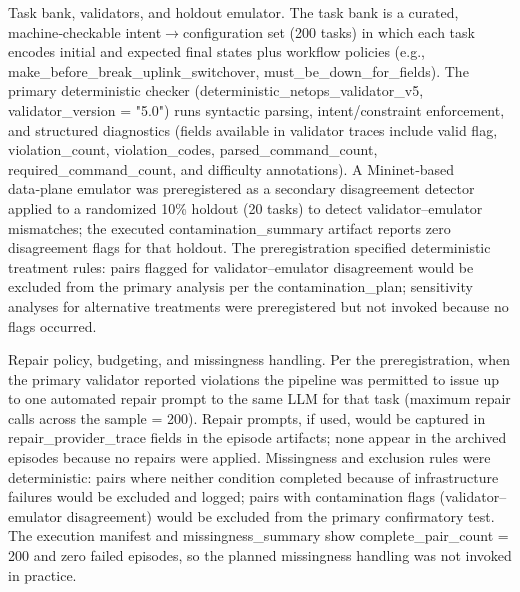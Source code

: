 \documentclass[conference]{IEEEtran}
\begin{document}
Task bank, validators, and holdout emulator. The task bank is a curated, machine‑checkable intent\ensuremath{\rightarrow}configuration set (200 tasks) in which each task encodes initial and expected final states plus workflow policies (e.g., make\_before\_break\_uplink\_switchover, must\_be\_down\_for\_fields). The primary deterministic checker (deterministic\_netops\_validator\_v5, validator\_version = "5.0") runs syntactic parsing, intent/constraint enforcement, and structured diagnostics (fields available in validator traces include valid flag, violation\_count, violation\_codes, parsed\_command\_count, required\_command\_count, and difficulty annotations). A Mininet‑based data‑plane emulator was preregistered as a secondary disagreement detector applied to a randomized 10\% holdout (20 tasks) to detect validator--emulator mismatches; the executed contamination\_summary artifact reports zero disagreement flags for that holdout. The preregistration specified deterministic treatment rules: pairs flagged for validator--emulator disagreement would be excluded from the primary analysis per the contamination\_plan; sensitivity analyses for alternative treatments were preregistered but not invoked because no flags occurred.

Repair policy, budgeting, and missingness handling. Per the preregistration, when the primary validator reported violations the pipeline was permitted to issue up to one automated repair prompt to the same LLM for that task (maximum repair calls across the sample = 200). Repair prompts, if used, would be captured in repair\_provider\_trace fields in the episode artifacts; none appear in the archived episodes because no repairs were applied. Missingness and exclusion rules were deterministic: pairs where neither condition completed because of infrastructure failures would be excluded and logged; pairs with contamination flags (validator--emulator disagreement) would be excluded from the primary confirmatory test. The execution manifest and missingness\_summary show complete\_pair\_count = 200 and zero failed episodes, so the planned missingness handling was not invoked in practice.
\end{document}
